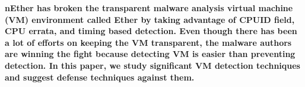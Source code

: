 \textbf{
nEther\cite{nether} has broken the transparent malware analysis virtual machine (VM) environment called Ether\cite{ether} by taking advantage of CPUID field, CPU errata, and timing based detection. Even though there has been a lot of efforts on keeping the VM transparent, the malware authors are winning the fight because detecting VM is easier than preventing detection. In this paper, we study significant VM detection techniques and suggest defense techniques against them.
}

